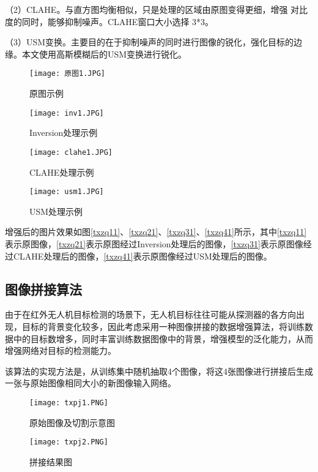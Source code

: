 （2）CLAHE。与直方图均衡相似，只是处理的区域由原图变得更细，增强
对比度的同时，能够抑制噪声。CLAHE窗口大小选择 3*3。

（3）USM变换。主要目的在于抑制噪声的同时进行图像的锐化，强化目标的边缘。本文使用高斯模糊后的USM变换进行锐化。

\begin{figure}[htbp]
	\centering
	\begin{minipage}{0.49\linewidth}
		\centering
		\texttt{[image: 原图1.JPG]}
		\caption{原图示例}
		\label{txzq11}%
	\end{minipage}
	\begin{minipage}{0.49\linewidth}
		\centering
		\texttt{[image: inv1.JPG]}
		\caption{Inversion处理示例}
		\label{txzq21}%
	\end{minipage}
	
	\begin{minipage}{0.49\linewidth}
		\centering
		\texttt{[image: clahe1.JPG]}
		\caption{CLAHE处理示例}
		\label{txzq31}%
	\end{minipage}
	\begin{minipage}{0.49\linewidth}
		\centering
		\texttt{[image: usm1.JPG]}
		\caption{USM处理示例}
		\label{txzq41}%
	\end{minipage}
  \label{txzq}
\end{figure}

增强后的图片效果如图\ref{txzq11}、\ref{txzq21}、\ref{txzq31}、\ref{txzq41}所示，其中\ref{txzq11}表示原图像，\ref{txzq21}表示原图经过Inversion处理后的图像，\ref{txzq31}表示原图像经过CLAHE处理后的图像，\ref{txzq41}表示原图像经过USM处理后的图像。

\subsection{图像拼接算法}
由于在红外无人机目标检测的场景下，无人机目标往往可能从探测器的各方向出现，目标的背景变化较多，因此考虑采用一种图像拼接的数据增强算法，将训练数据中的目标数增多，同时丰富训练数据图像中的背景，增强模型的泛化能力，从而增强网络对目标的检测能力。

该算法的实现方法是，从训练集中随机抽取4个图像，将这4张图像进行拼接后生成一张与原始图像相同大小的新图像输入网络。

\begin{figure}[htbp]
	\centering
	\begin{minipage}{0.49\linewidth}
		\centering
		\texttt{[image: txpj1.PNG]}
		\caption{原始图像及切割示意图}
		\label{txpj1}%
	\end{minipage}
	\begin{minipage}{0.49\linewidth}
		\centering
		\texttt{[image: txpj2.PNG]}
		\caption{拼接结果图}
		\label{txpj2}%
	\end{minipage}
\end{figure}

